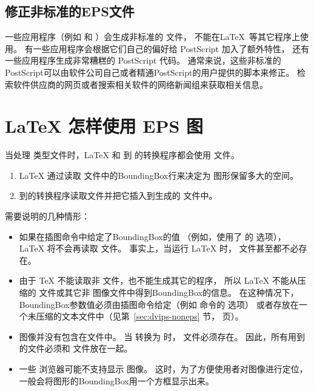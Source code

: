 \subsection{修正非标准的EPS文件}\label{ssec:fixeps}
一些应用程序（例如  和  ）会生成非标准的  文件，
不能在\LaTeX\ 等其它程序上使用。
有一些应用程序会根据它们自己的偏好给 PostScript 加入了额外特性，
还有一些应用程序生成非常糟糕的 PostScript 代码。
通常来说，这些非标准的PostScript可以由软件公司自己或者精通PostScript的用户提供的脚本来修正。
检索软件供应商的网页或者搜索相关软件的网络新闻组来获取相关信息。

\section{\LaTeX{} 怎样使用 EPS 图}\label{sec:useeps}

当处理 类型文件时，\LaTeX{} 和  到  的转换程序都会使用  文件。
\begin{enumerate}
	\item \LaTeX{} 通过读取  文件中的BoundingBox行来决定为  图形保留多大的空间。
	\item {} 到的转换程序读取文件并把它插入到生成的 文件中。
\end{enumerate}

需要说明的几种情形：
\begin{itemize}
	\item 如果在插图命令中给定了BoundingBox的值
	（例如，使用了  的  选项），
	\LaTeX{} 将不会再读取  文件。
	事实上，当运行 \LaTeX{} 时， 文件甚至都不必存在。
	\item 由于 \TeX{} 不能读取非 \ascii 文件，也不能生成其它的程序，
	所以 \LaTeX{} 不能从压缩的  文件或其它非  图像文件中得到BoundingBox的信息。
	在这种情况下，BoundingBox参数值必须由插图命令给定（例如  命令的  选项）
	或者存放在一个未压缩的文本文件中（见第~\ref{sec:dvips-noneps} 节，\pageref{sec:dvips-noneps} 页）。
	\item {} 图像并没有包含在文件中。
	当  转换为  时， 文件必须存在。
	因此，所有用到的文件必须和  文件放在一起。
	\item 一些  浏览器可能不支持显示  图像。
	这时，为了方便使用者对图像进行定位，一般会将图形的BoundingBox用一个方框显示出来。
\end{itemize}

